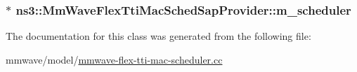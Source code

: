 \subsubsection[{\texorpdfstring{m\+\_\+scheduler}{m_scheduler}}]{$\ast$ ns3\+::\+Mm\+Wave\+Flex\+Tti\+Mac\+Sched\+Sap\+Provider\+::m\+\_\+scheduler\hspace{0.3cm}{\ttfamily [private]}}\hypertarget{classns3_1_1MmWaveFlexTtiMacSchedSapProvider_a5a463fe08e8812094418dda187d59c5b}{}\label{classns3_1_1MmWaveFlexTtiMacSchedSapProvider_a5a463fe08e8812094418dda187d59c5b}


The documentation for this class was generated from the following file\+:\begin{DoxyCompactItemize}
\item 
mmwave/model/\hyperlink{mmwave-flex-tti-mac-scheduler_8cc}{mmwave-\/flex-\/tti-\/mac-\/scheduler.\+cc}\end{DoxyCompactItemize}
